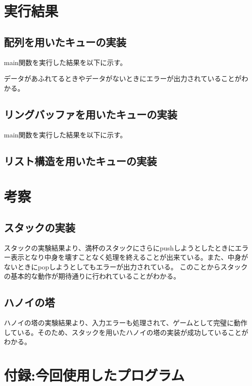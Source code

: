 \documentclass[dvipdfmx]{jsarticle}
\begin{document}
\section{実行結果}
\subsection{配列を用いたキューの実装}
main関数を実行した結果を以下に示す。

データがあふれてるときやデータがないときにエラーが出力されていることがわかる。
\subsection{リングバッファを用いたキューの実装}
main関数を実行した結果を以下に示す。


\subsection{リスト構造を用いたキューの実装}


% 
\section{考察}
\subsection{スタックの実装}
スタックの実験結果より、満杯のスタックにさらにpushしようとしたときにエラー表示となり中身を壊すことなく処理を終えることが出来ている。また、中身がないときにpopしようとしてもエラーが出力されている。
このことからスタックの基本的な動作が期待通りに行われていることがわかる。
\subsection{ハノイの塔}
ハノイの塔の実験結果より、入力エラーも処理されて、ゲームとして完璧に動作している。そのため、スタックを用いたハノイの塔の実装が成功していることがわかる。

\section{付録:今回使用したプログラム}



\end{document}
